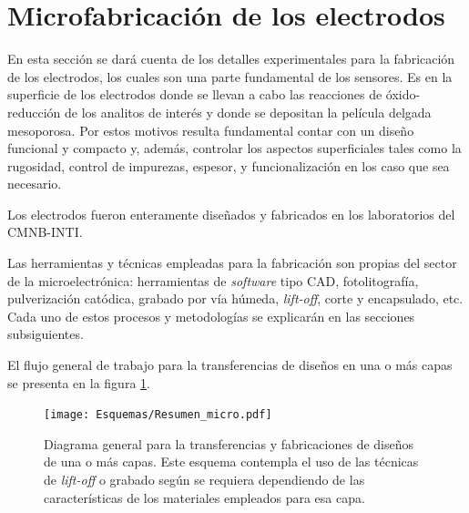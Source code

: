 
\section{Microfabricación de los electrodos}
		
	 En esta sección se dará cuenta de los detalles experimentales para la fabricación de los electrodos, los cuales son una parte fundamental de los sensores. Es en la superficie de los electrodos donde se llevan a cabo las reacciones de óxido-reducción de los analitos de interés y donde se depositan la película delgada mesoporosa. Por estos motivos resulta fundamental contar con un diseño funcional y compacto y, además, controlar los aspectos superficiales tales como la rugosidad, control de impurezas, espesor, y funcionalización en los caso que sea necesario.

	 Los electrodos fueron enteramente diseñados y fabricados en los laboratorios del CMNB-INTI. 
		
	 Las herramientas y técnicas empleadas para la fabricación son propias del sector de la microelectrónica: herramientas de \textit{software} tipo CAD, fotolitografía, pulverización catódica, grabado por vía húmeda, \textit{lift-off}, corte y encapsulado, etc.\cite{Franssila2004,Jaeger2001} Cada uno de estos procesos y metodologías se explicarán en las secciones subsiguientes. 

	 El flujo general de trabajo para la transferencias de diseños en una o más capas se presenta en la figura \ref{esq:micro}.
			
			 \begin{figure}[h!]
			  \begin{center}
			  \texttt{[image: Esquemas/Resumen\_micro.pdf]}
			  \caption[Esquema para la transferencia de diseños]{Diagrama general para la transferencias y fabricaciones de diseños de una o más capas. Este esquema contempla el uso de las técnicas de \textit{lift-off }o grabado según se requiera dependiendo de las características de los materiales empleados para esa capa.}
			  \label{esq:micro}
			  \end{center}
			  \end{figure}

